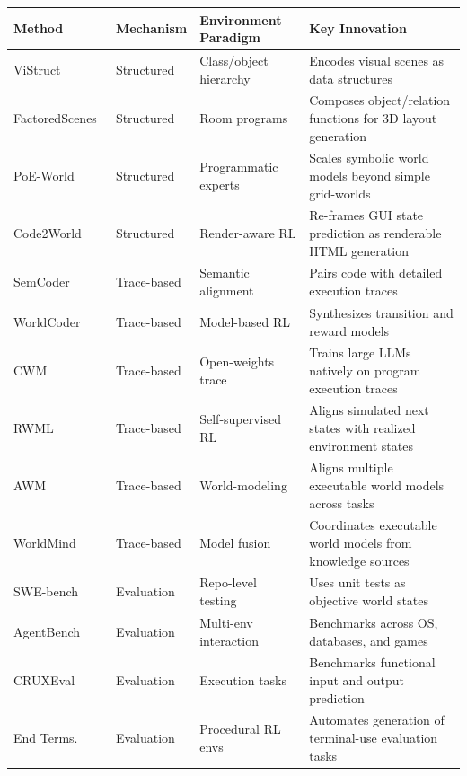 \documentclass{llmxive}
\providecommand{\arraystretch}{1.15}
\begin{document}
\begin{table}[t]
\centering
\renewcommand{\arraystretch}{1.15}
\setlength{\tabcolsep}{4pt}
\footnotesize
\begin{tabularx}{\textwidth}{p{2.8cm}p{2.0cm}p{3.1cm}X}
\toprule
\textbf{Method} & \textbf{Mechanism} & \textbf{Environment Paradigm} & \textbf{Key Innovation} \\
\midrule
ViStruct~\cite{chen2023vistruct} & Structured & Class/object hierarchy & Encodes visual scenes as data structures \\
FactoredScenes~\cite{hsu2025programs} & Structured & Room programs & Composes object/relation functions for 3D layout generation \\
PoE-World~\cite{piriyakulkij2025poe} & Structured & Programmatic experts & Scales symbolic world models beyond simple grid-worlds \\
Code2World~\cite{zheng2026code2world} & Structured & Render-aware RL & Re-frames GUI state prediction as renderable HTML generation \\
SemCoder~\cite{ding2024semcoder} & Trace-based & Semantic alignment & Pairs code with detailed execution traces \\
WorldCoder~\cite{tang2024worldcoder} & Trace-based & Model-based RL & Synthesizes transition and reward models \\
CWM~\cite{copet2025cwm} & Trace-based & Open-weights trace & Trains large LLMs natively on program execution traces \\
RWML~\cite{yu2026reinforcement} & Trace-based & Self-supervised RL & Aligns simulated next states with realized environment states \\
AWM~\cite{wang2026agent} & Trace-based & World-modeling & Aligns multiple executable world models across tasks \\
WorldMind~\cite{ren2026aligning} & Trace-based & Model fusion & Coordinates executable world models from knowledge sources \\
SWE-bench~\cite{jimenez2023swe} & Evaluation & Repo-level testing & Uses unit tests as objective world states \\
AgentBench~\cite{liu2023agentbench} & Evaluation & Multi-env interaction & Benchmarks across OS, databases, and games \\
CRUXEval~\cite{gu2024cruxeval} & Evaluation & Execution tasks & Benchmarks functional input and output prediction \\
End Terms.~\cite{gandhi2026endless} & Evaluation & Procedural RL envs & Automates generation of terminal-use evaluation tasks \\

\end{tabularx}
\end{table}
\end{document}
